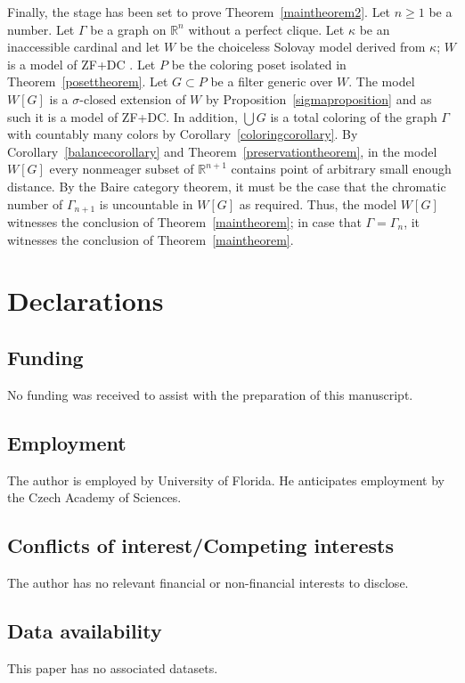 \documentclass{article}
\newcommand{\gs}{\sigma}
\theoremstyle{definition}
\begin{document}
Finally, the stage has been set to prove Theorem~\ref{maintheorem2}. Let $n\geq 1$ be a number. Let $\Gamma$ be a graph on $\mathbb{R}^n$ without a perfect clique. Let $\kappa$ be an inaccessible cardinal and let $W$ be the choiceless Solovay model derived from $\kappa$; $W$ is a model of ZF+DC \cite[Theorem 26.14]{jech:newset}. Let $P$ be the coloring poset isolated in Theorem~\ref{posettheorem}. Let $G\subset P$ be a filter generic over $W$. The model $W[G]$ is a $\gs$-closed extension of $W$ by Proposition~\ref{sigmaproposition} and as such it is a model of ZF+DC. In addition, $\bigcup G$ is a total coloring of the graph $\Gamma$ with countably many colors by Corollary~\ref{coloringcorollary}. By Corollary~\ref{balancecorollary} and Theorem~\ref{preservationtheorem}, in the model $W[G]$ every nonmeager subset of $\mathbb{R}^{n+1}$ contains point of arbitrary small enough distance. By the Baire category theorem, it must be the case that the chromatic number of $\Gamma_{n+1}$ is uncountable in $W[G]$ as required. Thus, the model $W[G]$ witnesses the conclusion of Theorem~\ref{maintheorem}; in case that $\Gamma=\Gamma_n$, it witnesses the conclusion of Theorem~\ref{maintheorem}.

\section{Declarations}

\subsection{Funding}

No funding was received to assist with the preparation of this manuscript.

\subsection{Employment}

The author is employed by University of Florida. He anticipates employment by the Czech Academy of Sciences.

\subsection{Conflicts of interest/Competing interests}

The author has no relevant financial or non-financial interests to disclose.

\subsection{Data availability}

This paper has no associated datasets.

 

\end{document}
